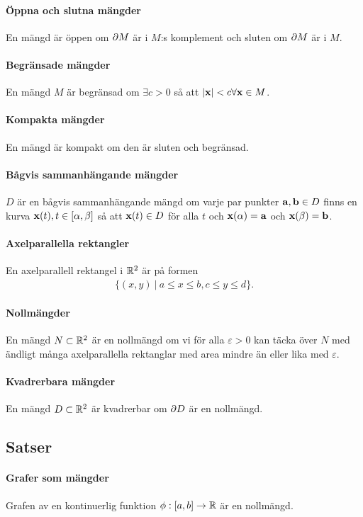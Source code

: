 \paragraph{Öppna och slutna mängder}
En mängd är öppen om $\partial M$ är i $M$:s komplement och sluten om $\partial M$ är i $M$.

\paragraph{Begränsade mängder}
En mängd $M$ är begränsad om $\exists c > 0$ så att $\abs{\vect{x}} < c\forall \vect{x}\in M$.

\paragraph{Kompakta mängder}
En mängd är kompakt om den är sluten och begränsad.

\paragraph{Bågvis sammanhängande mängder}
$D$ är en bågvis sammanhängande mängd om varje par punkter $\vect{a}, \vect{b}\in D$ finns en kurva $\vect{x}(t), t\in [\alpha, \beta]$ så att $\vect{x}(t)\in D$ för alla $t$ och $\vect{x}(\alpha) = \vect{a}$ och $\vect{x}(\beta) = \vect{b}$.

\paragraph{Axelparallella rektangler}
En axelparallell rektangel i $\mathbb{R}^2$ är på formen
\begin{align*}
	\{(x, y)\ |\ a\leq x\leq b, c\leq y\leq d\}.
\end{align*}

\paragraph{Nollmängder}
En mängd $N\subset\mathbb{R}^2$ är en nollmängd om vi för alla $\varepsilon > 0$ kan täcka över $N$ med ändligt många axelparallella rektanglar med area mindre än eller lika med $\varepsilon$.

\paragraph{Kvadrerbara mängder}
En mängd $D\subset\mathbb{R}^2$ är kvadrerbar om $\partial D$ är en nollmängd.

\subsection{Satser}

\paragraph{Grafer som mängder}
Grafen av en kontinuerlig funktion $\phi: [a, b]\to\mathbb{R}$ är en nollmängd.

\proof